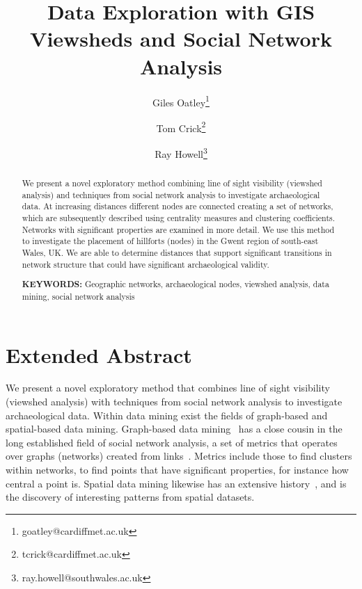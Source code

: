 \documentclass[11pt]{article}
\title{Data Exploration with GIS Viewsheds and Social Network Analysis}
\author[1]{Giles Oatley\thanks{goatley@cardiffmet.ac.uk}}
\author[1]{Tom Crick\thanks{tcrick@cardiffmet.ac.uk}}
\author[2]{Ray Howell\thanks{ray.howell@southwales.ac.uk}}
\affil[1]{Department of Computing, Cardiff Metropolitan University, UK}
\affil[2]{Faculty of Business and Society, University of South Wales, UK}
\date{ }
\begin{document}
\maketitle

\begin{abstract}
\centering

We present a novel exploratory method combining line of sight
visibility (viewshed analysis) and techniques from social network
analysis to investigate archaeological data. At increasing distances
different nodes are connected creating a set of networks, which are
subsequently described using centrality measures and clustering
coefficients. Networks with significant properties are examined in
more detail. We use this method to investigate the placement of
hillforts (nodes) in the Gwent region of south-east Wales, UK. We are
able to determine distances that support significant transitions in
network structure that could have significant archaeological validity.

$ $ \\ {\bf KEYWORDS:} Geographic networks, archaeological nodes,
viewshed analysis, data mining, social network analysis

\end{abstract}


\section*{Extended Abstract}

We present a novel exploratory method that combines line of sight
visibility (viewshed analysis) with techniques from social network
analysis to investigate archaeological data. Within data mining exist
the fields of graph-based and spatial-based data mining. Graph-based
data mining~\citep{cook+holder:2006} has a close cousin in the long
established field of social network analysis, a set of metrics that
operates over graphs (networks) created from
links~\citep{wasserman+faust:1995}. Metrics include those to find
clusters within networks, to find points that have significant
properties, for instance how central a point is. Spatial data mining
likewise has an extensive history~\citep{lu-et-al:1993}, and is the
discovery of interesting patterns from spatial datasets.
\end{document}
